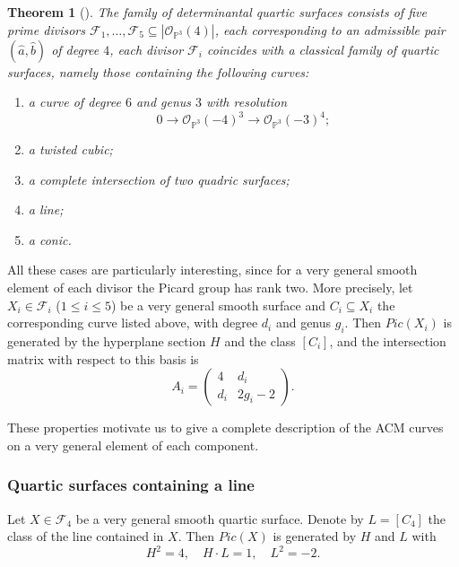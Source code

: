 \documentclass[12pt,reqno]{amsart}
\theoremstyle{plain}
\newtheorem{thm}[theorem]{Theorem}
\theoremstyle{definition}
\theoremstyle{remark}
\theoremstyle{definition}
\newcommand{\PP}{\mathds{P}}
\newcommand{\oo}{\mathcal{O}}
\begin{document}
\begin{thm}[\cite{LLV}]\label{thm::quarticDivisors}
The family of determinantal quartic surfaces consists of five prime divisors
$\mathcal{F}_1,\ldots,\mathcal{F}_5\subseteq|\oo_{\PP^3}(4)|$, each corresponding to an
admissible pair $(\hat{a},\hat{b})$ of degree $4$, each divisor $\mathcal{F}_i$ coincides with a classical family of quartic
surfaces, namely those containing the following curves:
\begin{enumerate}
    \item[$\mathcal{F}_1:$] a curve of degree $6$ and genus $3$ with resolution
    \[
    0\to\oo_{\PP^3}(-4)^3\to\oo_{\PP^3}(-3)^4;
    \]
    \item[$\mathcal{F}_2:$] a twisted cubic;
    \item[$\mathcal{F}_3:$] a complete intersection of two quadric surfaces;
    \item[$\mathcal{F}_4:$] a line;
    \item[$\mathcal{F}_5:$] a conic.
\end{enumerate}
\end{thm}
All these cases are particularly interesting, since for a very general smooth element
of each divisor the Picard group has rank two. More precisely, let
$X_i\in\mathcal{F}_i$ ($1\leq i\leq5$) be a very general smooth surface and
$C_i\subseteq X_i$ the corresponding curve listed above, with degree $d_i$ and genus
$g_i$. Then $Pic(X_i)$ is generated by the hyperplane section $H$ and the class $[C_i]$,
and the intersection matrix with respect to this basis is
\[
A_i=
\begin{pmatrix}
4 & d_i\\
d_i & 2g_i-2
\end{pmatrix}.
\]

These properties motivate us to give a complete description of the ACM curves on a
very general element of each component.

\subsubsection{\textbf{Quartic surfaces containing a line}}

Let $X\in\mathcal{F}_4$ be a very general smooth quartic surface. Denote by $L=[C_4]$
the class of the line contained in $X$. Then $Pic(X)$ is generated by $H$ and $L$ with
\[
H^2=4,\quad H\cdot L=1,\quad L^2=-2.
\]
\end{document}
